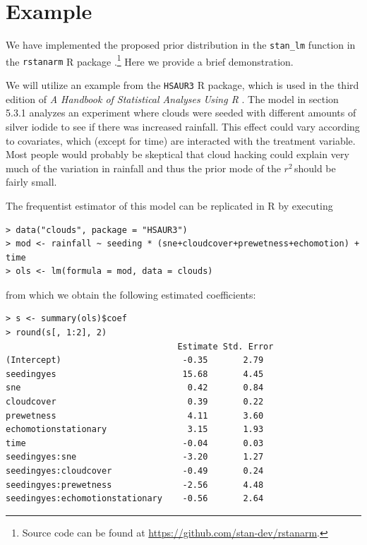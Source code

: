 \documentclass[11pt]{article}
\newcommand{\Rsq}{$r^2\,$}
\begin{document}
\section{Example}
\label{sec:example}


We have implemented the proposed prior distribution in the {\tt stan\_lm}
function in the {\tt rstanarm} R package \cite{rstanarm}.\footnote{Source
code can be found at \url{https://github.com/stan-dev/rstanarm}.}
Here we provide a brief demonstration.

We will utilize an example from the {\tt HSAUR3} R package, which is used in the
third edition of \emph{A Handbook of Statistical Analyses Using R}
\cite{HSAUR3-book}. The model in section 5.3.1 analyzes an experiment where
clouds were seeded with different amounts of silver iodide to see if there was
increased rainfall. This effect could vary according to covariates, which
(except for time) are interacted with the treatment variable. Most people would
probably be skeptical that cloud hacking could explain very much of the
variation in rainfall and thus the prior mode of the \Rsq should be fairly
small.

The frequentist estimator of this model can be replicated in R by executing

\vspace{.5cm}
\begin{lstlisting}[frame=lines]
> data("clouds", package = "HSAUR3")
> mod <- rainfall ~ seeding * (sne+cloudcover+prewetness+echomotion) + time
> ols <- lm(formula = mod, data = clouds)
\end{lstlisting}
\vspace{.5cm}

\noindent from which we obtain the following estimated coefficients:

\vspace{.5cm}
\begin{lstlisting}[frame=lines]
> s <- summary(ols)$coef
> round(s[, 1:2], 2)
                                  Estimate Std. Error
(Intercept)                        -0.35       2.79
seedingyes                         15.68       4.45
sne                                 0.42       0.84
cloudcover                          0.39       0.22
prewetness                          4.11       3.60
echomotionstationary                3.15       1.93
time                               -0.04       0.03
seedingyes:sne                     -3.20       1.27
seedingyes:cloudcover              -0.49       0.24
seedingyes:prewetness              -2.56       4.48
seedingyes:echomotionstationary    -0.56       2.64
\end{lstlisting}
\vspace{.5cm}
\end{document}
